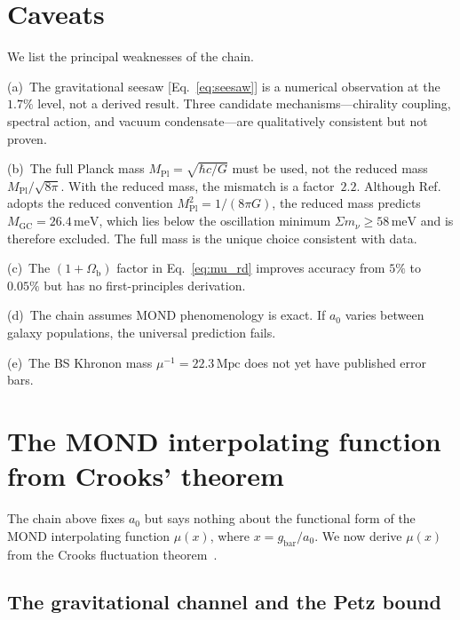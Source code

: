 \documentclass[prl,twocolumn,superscriptaddress,longbibliography]{revtex4-2}
\newcommand{\Mpc}{\,\mathrm{Mpc}}
\newcommand{\meV}{\,\mathrm{meV}}
\newcommand{\Ob}{\Omega_{\mathrm{b}}}
\newcommand{\MPl}{M_{\mathrm{Pl}}}
\newcommand{\MGC}{M_{\mathrm{GC}}}
\newcommand{\azero}{a_0}
\newcommand{\sumnu}{\Sigma m_\nu}
\begin{document}
\section{Caveats}

We list the principal weaknesses of the chain.

(a)~The gravitational seesaw [Eq.~\eqref{eq:seesaw}]
is a numerical observation at the $1.7\%$ level,
not a derived result.
Three candidate mechanisms---chirality coupling,
spectral action, and vacuum condensate---are
qualitatively consistent but not proven.

(b)~The full Planck mass $\MPl = \sqrt{\hbar c/G}$
must be used, not the reduced mass
$\MPl/\sqrt{8\pi}$.
With the reduced mass, the mismatch is a factor~$2.2$.
Although Ref.~\cite{ArkaniHamed2004} adopts the reduced
convention $M_{\mathrm{Pl}}^2 = 1/(8\pi G)$,
the reduced mass predicts $\MGC = 26.4\meV$, which lies
below the oscillation minimum $\sumnu \geq 58\meV$ and
is therefore excluded.
The full mass is the unique choice consistent with data.

(c)~The $(1+\Ob)$ factor in Eq.~\eqref{eq:mu_rd}
improves accuracy from $5\%$ to $0.05\%$
but has no first-principles derivation.

(d)~The chain assumes MOND phenomenology is exact.
If $\azero$ varies between galaxy populations,
the universal prediction fails.

(e)~The BS Khronon mass $\mu^{-1} = 22.3\Mpc$
does not yet have published error bars.

\section{The MOND interpolating function from Crooks' theorem}
\label{sec:crooks}

The chain above fixes $\azero$ but says nothing about the
functional form of the MOND interpolating function
$\mu(x)$, where $x = g_{\mathrm{bar}}/\azero$.
We now derive $\mu(x)$ from the Crooks fluctuation
theorem~\cite{Crooks1999}.

\subsection{The gravitational channel and the Petz bound}
\end{document}
